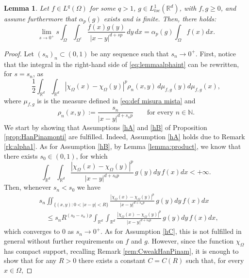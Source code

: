 \documentclass[reqno,11pt]{amsart}
\numberwithin{equation}{section}
\theoremstyle{definition} %
\theoremstyle{plain}
\newtheorem{lemma}[lemma]{Lemma}
\theoremstyle{definition}
\theoremstyle{remark}
\def\elleom#1{L^{#1}(\Omega)}
\def\O{\Omega}
\def\io{\int_\Omega}
\def\R{\mathbb{R}}
\def\Rd{\mathbb{R}^d}
\newcommand{\abs}[1]{\left|#1\right|}
\begin{document}
\begin{lemma}
\label{lemma:alpha-int}
Let $f\in\elleom q$ for some $q>1$, $g\in L^1_{loc}(\Rd)$, with $f,g\geq 0$, and assume furthermore that $\alpha_p(g)$ exists and is finite. Then, there holds:
\begin{equation}
    \label{eq:lemmaalphaint}
     \lim_{s\to0^+} s\io\int_{\O^c}\frac{f(x)g(y)}{\abs{x-y}^{d+sp}}\,dy\,dx
     =
     \alpha_p(g)\int_{\O}f(x)dx.
\end{equation}
\end{lemma}
\begin{proof}
Let $(s_n)_n\subset(0,1)$ be any sequence such that $s_n\to0^+$. First, notice that the integral in the right-hand side of \eqref{eq:lemmaalphaint} can be rewritten, for $s=s_n$, as
\begin{equation*}
    \frac{1}{2}\int_{\R^d}\int_{\R^d}\abs{\chi_{\Omega}(x)-\chi_{\Omega}(y)}^p\rho_n(x,y)\,d\mu_{f,g}(y)d\mu_{f,g}(x),
\end{equation*}
where $\mu_{f,g}$ is is the measure defined in \eqref{eq:def misura mista} and 
$$\rho_n(x,y):=\frac{s_n}{|x-y|^{d+s_np}}\qquad\text{for every }n\in \mathbb{N}.$$
We start by showing that Assumptions \ref{hA} and \ref{hB} of Proposition \ref{prop:HanPinamonti} are fulfilled. Indeed, Assumption \ref{hA} holds due to Remark \ref{rk:alpha1}. As for Assumption \ref{hB}, by Lemma \ref{lemma:product}, we know that there exists $s_0\in(0,1)$, for which
\begin{equation*}
    \int_{\R^d}\int_{\R^d}\frac{\abs{\chi_{\Omega}(x)-\chi_{\Omega}(y)}^p}{\abs{x-y}^{d+s_0p}}\,g(y)dy\,f(x)dx<+\infty.
\end{equation*}
Then, whenever $s_n<s_0$ we have
\begin{equation*}
    \begin{split}
        &s_n\iint_{\{(x,y):0<|x-y|<R\}}\frac{\abs{\chi_{\Omega}(x)-\chi_{\Omega}(y)}^p}{\abs{x-y}^{d+s_np}}\,g(y)dy\,f(x)dx\\
        &\quad\leq s_nR^{(s_0-s_n)p} \int_{\R^d}\int_{\R^d}\frac{\abs{\chi_{\Omega}(x)-\chi_{\Omega}(y)}^p}{\abs{x-y}^{d+s_0p}}\,g(y)dy\,f(x)dx,
    \end{split}
\end{equation*}
which converges to $0$ as $s_n\to0^+$. 
As for Assumption \ref{hC}, this is not fulfilled in general without further requirements on $f$ and $g$. However, since the function $\chi_\Omega$ has compact support, recalling Remark \ref{rem:CweakHanPinam}, it is enough to show that for any $R>0$ there exists a constant $C=C(R)$ such that, for every $x\in \O$,

\end{proof}
\end{document}
